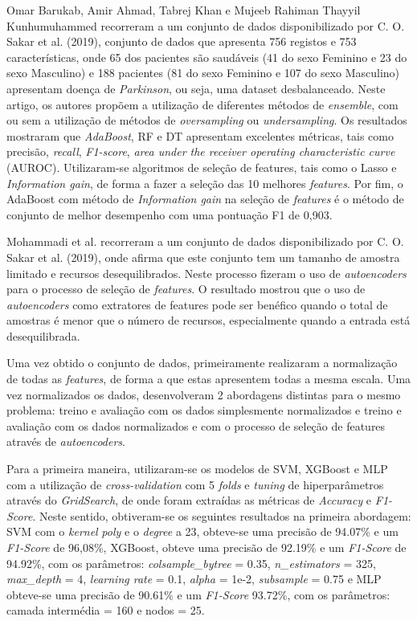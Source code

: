 \documentclass[12pt,a4paper,twoside]{report}
\begin{document}
{Omar Barukab, Amir Ahmad, Tabrej Khan e Mujeeb Rahiman Thayyil Kunhumuhammed \cite{diagnostics12123000} recorreram a um conjunto de dados
disponibilizado por C. O. Sakar et al. (2019), conjunto de dados que apresenta  756 registos e 753 características, onde 65 dos pacientes são saudáveis (41 do sexo Feminino e 23 do sexo Masculino) e 188 pacientes (81 do sexo Feminino e 107 do sexo Masculino) apresentam doença de \textit{Parkinson}, ou seja, uma dataset desbalanceado. Neste artigo, os autores propõem a utilização de diferentes métodos de \textit{ensemble}, com ou sem a utilização de métodos de \textit{oversampling} ou \textit{undersampling}. Os resultados mostraram que
\textit{AdaBoost}, \gls{RF} e  \gls{DT} apresentam excelentes métricas, tais como precisão, \textit{recall}, \textit{F1-score}, \textit{area under the receiver operating characteristic curve} (AUROC). Utilizaram-se algoritmos de seleção de   features, tais como o Lasso e \textit{Information gain}, de forma a fazer a seleção das 10 melhores \textit{features}. Por fim, o AdaBoost com método de \textit{Information gain} na seleção de \textit{features} é o método de conjunto de melhor desempenho com uma pontuação F1 de 0,903.

Mohammadi et al.\cite{MOHAMMADI2021100079} recorreram a um conjunto de dados disponibilizado por C. O. Sakar et al. (2019), onde afirma que este conjunto tem um tamanho de amostra limitado e recursos desequilibrados. Neste processo fizeram o uso de \textit{autoencoders} para o processo de seleção de \textit{features}. O resultado mostrou que o uso de \textit{autoencoders} como extratores de features pode ser benéfico quando o total de amostras é menor que o número de recursos, especialmente quando a entrada está desequilibrada. 

Uma vez obtido o conjunto de dados, primeiramente realizaram a normalização de todas as \textit{features}, de forma a que estas apresentem todas a mesma escala. Uma vez normalizados os dados, desenvolveram 2 abordagens distintas para o mesmo problema: treino e avaliação com os dados simplesmente normalizados e treino e avaliação com os dados normalizados e com o processo de seleção de features através de \textit{autoencoders}.

Para a primeira maneira, utilizaram-se os modelos de \gls{SVM}, \Gls{XGBoost} e \Gls{MLP} com a utilização de \textit{cross-validation} com 5 \textit{folds} e \textit{tuning} de hiperparâmetros através do \textit{GridSearch}, de onde foram extraídas as métricas de \textit{Accuracy} e \textit{F1-Score}. Neste sentido, obtiveram-se os seguintes resultados na primeira abordagem:  \gls{SVM} com o \textit{kernel} \textit{poly} e o \textit{degree} a 23, obteve-se uma precisão de 94.07\% e um \textit{F1-Score} de 96,08\%, \gls{XGBoost}, obteve uma precisão de 92.19\% e um \textit{F1-Score} de 94.92\%, com os parâmetros: \textit{colsample\_bytree} = 0.35, \textit{n\_estimators} = 325, \textit{max\_depth} = 4, \textit{learning rate} = 0.1, \textit{alpha} = 1e-2, \textit{subsample} = 0.75 e \gls{MLP} obteve-se uma precisão de 90.61\% e um \textit{F1-Score} 93.72\%, com os parâmetros: camada intermédia = 160 e nodos = 25.

}
\end{document}
